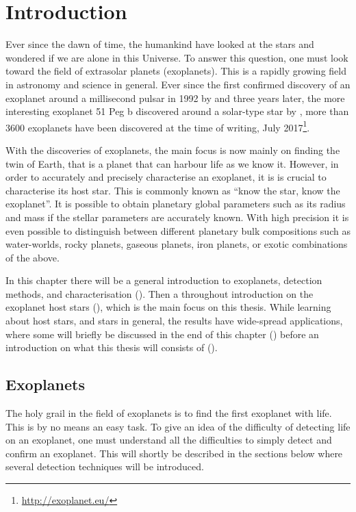 \chapter{Introduction}
\label{cha:introduction}

Ever since the dawn of time, the humankind have looked at the stars and wondered if we are alone in
this Universe. To answer this question, one must look toward the field of extrasolar planets
(exoplanets). This is a rapidly growing field in astronomy and science in general. Ever since the
first confirmed discovery of an exoplanet around a millisecond pulsar in 1992 by
\citet{Wolszczan1992} and three years later, the more interesting exoplanet 51 Peg b discovered
around a solar-type star by \citet{Mayor1995}, more than 3600 exoplanets have been discovered at the
time of writing, July 2017\footnote{\url{http://exoplanet.eu/}}.

With the discoveries of exoplanets, the main focus is now mainly on finding the twin of Earth, that
is a planet that can harbour life as we know it. However, in order to accurately and precisely
characterise an exoplanet, it is is crucial to characterise its host star. This is commonly known as
``know the star, know the exoplanet''. It is possible to obtain planetary global parameters such as
its radius and mass if the stellar parameters are accurately known. With high precision it is even
possible to distinguish between different planetary bulk compositions such as water-worlds, rocky
planets, gaseous planets, iron planets, or exotic combinations of the above.

In this chapter there will be a general introduction to exoplanets, detection methods, and
characterisation (). Then a throughout introduction on the exoplanet host
stars (), which is the main focus on this thesis. While learning about
host stars, and stars in general, the results have wide-spread applications, where some will briefly
be discussed in the end of this chapter () before an introduction on
what this thesis will consists of ().



\section{Exoplanets}
\label{sec:exoplanets}

The holy grail in the field of exoplanets is to find the first exoplanet with life. This is by no
means an easy task. To give an idea of the difficulty of detecting life on an exoplanet, one must
understand all the difficulties to simply detect and confirm an exoplanet. This will shortly be
described in the sections below where several detection techniques will be introduced.

